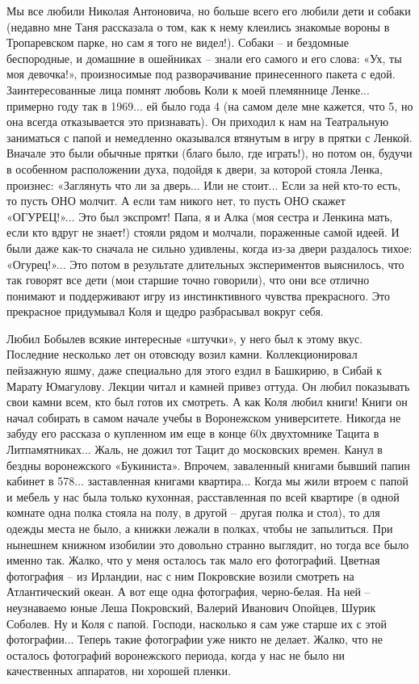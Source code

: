 Мы все любили Николая Антоновича, но больше всего его любили дети и собаки (недавно мне Таня рассказала о том, как к нему клеились знакомые вороны в Тропаревском парке, но сам я того не видел!). Собаки – и бездомные беспородные, и домашние в ошейниках – знали его самого и его слова: «Ух, ты моя девочка!», произносимые под разворачивание принесенного пакета с едой. Заинтересованные лица помнят любовь Коли к моей племяннице Ленке... примерно году так в 1969... ей было года 4 (на самом деле мне кажется, что 5, но она всегда отказывается это признавать). Он приходил к нам на Театральную заниматься с папой и немедленно оказывался втянутым в игру в прятки с Ленкой. Вначале это были обычные прятки (благо было, где играть!), но потом он, будучи в особенном расположении духа, подойдя к двери, за которой стояла Ленка, произнес: «Заглянуть что ли за дверь... Или не стоит... Если за ней кто-то есть, то пусть ОНО молчит. А если там никого нет, то пусть ОНО скажет «ОГУРЕЦ!»... Это был экспромт! Папа, я и Алка (моя сестра и Ленкина мать, если кто вдруг не знает!) стояли рядом и молчали, пораженные самой идеей. И были даже как-то сначала не сильно удивлены, когда из-за двери раздалось тихое: «Огурец!»... Это потом в результате длительных экспериментов выяснилось, что так говорят все дети (мои старшие точно говорили), что они все отлично понимают и поддерживают игру из инстинктивного чувства прекрасного. Это прекрасное придумывал Коля и щедро разбрасывал вокруг себя.

Любил Бобылев всякие интересные «штучки», у него
\linebreak
был к этому вкус.
Последние несколько лет он отовсюду возил камни. Коллекционировал пейзажную яшму, даже специально для этого ездил в Башкирию, в Сибай к Марату Юмагулову. Лекции читал и камней привез оттуда. Он любил показывать свои камни всем, кто был готов их смотреть. А как Коля любил книги! Книги он начал собирать в самом начале учебы в Воронежском университете. Никогда не забуду его рассказа о купленном им еще в конце 60х двухтомнике Тацита в Литпамятниках... Жаль, не дожил тот Тацит до московских времен. Канул в бездны воронежского «Букиниста». Впрочем, заваленный книгами бывший папин кабинет в 578... заставленная книгами квартира... Когда мы жили втроем с папой и мебель у нас была только кухонная, расставленная по всей квартире (в одной комнате одна полка стояла на полу, в другой – другая полка и стол), то для одежды места не было, а книжки лежали в полках, чтобы не запылиться. При нынешнем книжном изобилии это довольно странно выглядит, но тогда все было именно так.
Жалко, что у меня осталось так мало его фотографий. Цветная фотография – из Ирландии, нас с ним Покровские возили смотреть на Атлантический океан. А вот еще одна фотография, черно-белая. На ней – неузнаваемо юные Леша Покровский, Валерий Иванович Опойцев, Шурик Соболев. Ну и Коля с папой. Господи, насколько я сам уже старше их с этой фотографии... Теперь такие фотографии уже никто не делает. Жалко, что не осталось фотографий воронежского периода, когда у нас не было ни качественных аппаратов, ни хорошей пленки.

